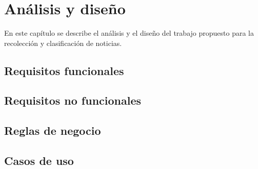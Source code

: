 \chapter{Análisis y diseño}

En este capítulo se describe el análisis y el diseño del trabajo propuesto para
la recolección y clasificación de noticias.

\section{Requisitos funcionales}


\section{Requisitos no funcionales}


\section{Reglas de negocio}



\newpage
\section{Casos de uso}



{\setlength{\parindent}{0pt}%
  
  \newpage
  
  \newpage
  
  \newpage
  
  \newpage
  

}


